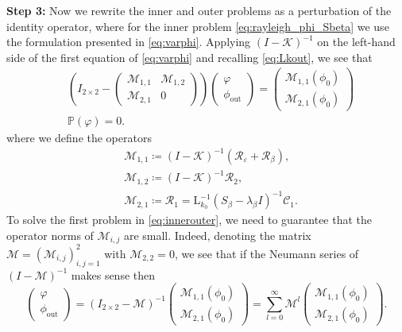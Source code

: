 \documentclass[11pt,reqno]{amsproc}
\def\eps{\varepsilon}
\newcommand{\rmout}{\mathrm{out}}
\newcommand{\rmL}{\mathrm{L}}
\newcommand{\cM}{\mathcal{M}}
\newcommand{\cK}{\mathcal{K}}
\newcommand{\cR}{\mathcal{R}}
\theoremstyle{definition}
\theoremstyle{definition}
\numberwithin{equation}{section}
\begin{document}
 \textbf{Step 3:} Now we rewrite the inner and outer problems as a perturbation of the identity operator, where for the inner problem \cref{eq:rayleigh_phi_Sbeta} we use the formulation presented in \cref{eq:varphi}. Applying $(I-\cK)^{-1}$ on the left-hand side of the first equation of \cref{eq:varphi} and recalling \cref{eq:Lkout}, we see that 
 \begin{align}
 \label{eq:innerouter}
  &\left(I_{2\times 2}-\begin{pmatrix}
    \cM_{1,1} &\cM_{1,2}\\
      \cM_{2,1} & 0
  \end{pmatrix}\right) \begin{pmatrix}
      \varphi \\
      \phi_{\rmout}
  \end{pmatrix}=\begin{pmatrix}
      \cM_{1,1}(\phi_0)\\
      \cM_{2,1}(\phi_0)
  \end{pmatrix}\\
  \label{eq:projection}&\mathbb{P}(\varphi)=0.
 \end{align}
where we define the operators 
\begin{align}
   \label{def:M11}&\cM_{1,1}\coloneqq(I-\cK)^{-1}(\cR_\eps+\cR_{\beta}),\\
   &\cM_{1,2}\coloneqq(I-\cK)^{-1}\cR_2,\\
   &\cM_{2,1}\coloneqq\cR_1=   \rmL_{k_0}^{-1}(S_\beta-\lambda_\beta I)^{-1}\mathcal{C}_1.
\end{align}
To solve the first problem in \cref{eq:innerouter}, we need to guarantee that the operator norms of $\cM_{i,j}$ are small. Indeed, denoting the matrix $\cM=(\cM_{i,j})_{i,j=1}^2$ with $\cM_{2,2}=0$, we see that if the Neumann series of $(I-\cM)^{-1}$ makes sense then 
\begin{equation}
\label{eq:solvaprhi}
    \begin{pmatrix}
      \varphi \\
      \phi_{\rmout}
  \end{pmatrix}=(I_{2\times 2}-\cM)^{-1}\begin{pmatrix}
      \cM_{1,1}(\phi_0)\\
      \cM_{2,1}(\phi_0)
  \end{pmatrix}=\sum_{l=0}^\infty \cM^l\begin{pmatrix}
      \cM_{1,1}(\phi_0)\\
      \cM_{2,1}(\phi_0)
  \end{pmatrix}.
\end{equation}
\end{document}
